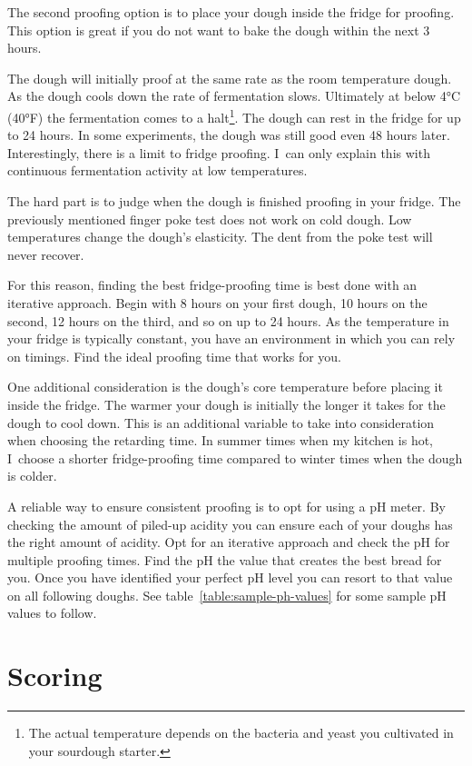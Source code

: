 The second proofing option is to place your dough inside the fridge for
proofing. This option is great if you do not want to bake the dough
within the next 3 hours.

The dough will initially proof at the same rate as the room temperature dough.
As the dough cools down the rate of fermentation slows. Ultimately at below
4°C (40°F) the fermentation comes to a halt\footnote{The actual temperature
depends on the bacteria and yeast you cultivated in your sourdough
starter.}. The dough can rest in the fridge for up to 24 hours. In some
experiments, the dough was still good even 48 hours later. Interestingly,
there is a limit to fridge proofing. I~can only explain this with continuous
fermentation activity at low temperatures.

The hard part is to judge when the dough is finished proofing in your fridge.
The previously mentioned finger poke test does not work on cold dough. Low
temperatures change the dough's elasticity. The dent from the poke test
will never recover.

For this reason, finding the best fridge-proofing time is best done
with an iterative approach. Begin with 8 hours on your first dough,
10 hours on the second, 12 hours on the third, and so on up to 24 hours.
As the temperature in your fridge is typically constant, you have an
environment in which you can rely on timings. Find the ideal proofing
time that works for you.

One additional consideration is the dough's core temperature before
placing it inside the fridge. The warmer your dough is initially
the longer it takes for the dough to cool down. This is an additional
variable to take into consideration when choosing the retarding time.
In summer times when my kitchen is hot, I~choose a shorter fridge-proofing
time compared to winter times when the dough is colder.

A reliable way to ensure consistent proofing is to opt for using a pH
meter. By checking the amount of piled-up acidity you can ensure
each of your doughs has the right amount of acidity. Opt for an iterative
approach and check the pH for multiple proofing times. Find the pH
the value that creates the best bread for you. Once you have identified
your perfect pH level you can resort to that value on all following
doughs. See table~\ref{table:sample-ph-values} for some sample pH values
to follow.

\section{Scoring}


